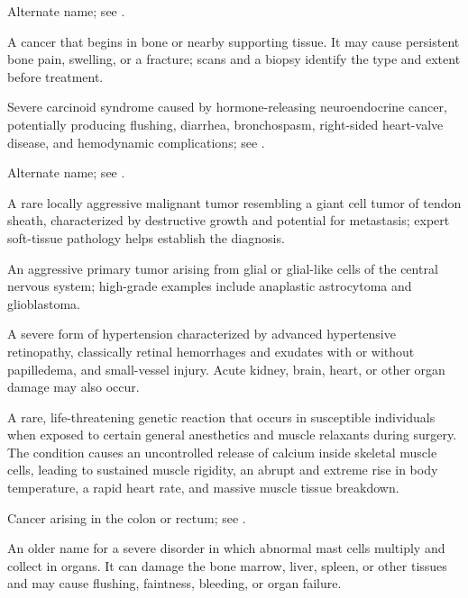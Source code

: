  Alternate name; see .

 A cancer that begins in bone or nearby supporting tissue. It may cause persistent bone pain, swelling, or a fracture; scans and a biopsy identify the type and extent before treatment.

 Severe carcinoid syndrome caused by hormone-releasing neuroendocrine cancer, potentially producing flushing, diarrhea, bronchospasm, right-sided heart-valve disease, and hemodynamic complications; see .

 Alternate name; see .

 A rare locally aggressive malignant tumor resembling a giant cell tumor of tendon sheath, characterized by destructive growth and potential for metastasis; expert soft-tissue pathology helps establish the diagnosis.

 An aggressive primary tumor arising from glial or glial-like cells of the central nervous system; high-grade examples include anaplastic astrocytoma and glioblastoma.

 A severe form of hypertension characterized by advanced hypertensive retinopathy, classically retinal hemorrhages and exudates with or without papilledema, and small-vessel injury. Acute kidney, brain, heart, or other organ damage may also occur.

 A rare, life-threatening genetic reaction that occurs in susceptible individuals when exposed to certain general anesthetics and muscle relaxants during surgery. The condition causes an uncontrolled release of calcium inside skeletal muscle cells, leading to sustained muscle rigidity, an abrupt and extreme rise in body temperature, a rapid heart rate, and massive muscle tissue breakdown.

 Cancer arising in the colon or rectum; see .

 An older name for a severe disorder in which abnormal mast cells multiply and collect in organs. It can damage the bone marrow, liver, spleen, or other tissues and may cause flushing, faintness, bleeding, or organ failure.

